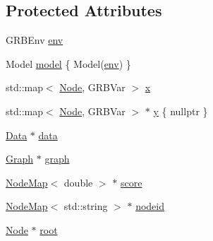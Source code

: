 \subsection*{Protected Attributes}
\begin{DoxyCompactItemize}
\item 
G\+R\+B\+Env \hyperlink{classderegnet_1_1DeregnetModel_accd03120356b80b083041b4eef003e5b}{env}
\item 
Model \hyperlink{classderegnet_1_1DeregnetModel_a30d525de2086e342b33fe3e45ede4947}{model} \{ Model(\hyperlink{classderegnet_1_1DeregnetModel_accd03120356b80b083041b4eef003e5b}{env}) \}
\item 
std\+::map$<$ \hyperlink{namespacederegnet_a744bad34f2de9856d36715a445f027f3}{Node}, G\+R\+B\+Var $>$ \hyperlink{classderegnet_1_1DeregnetModel_a360c980f3fec4dfbab50e9bb06a933a8}{x}
\item 
std\+::map$<$ \hyperlink{namespacederegnet_a744bad34f2de9856d36715a445f027f3}{Node}, G\+R\+B\+Var $>$ $\ast$ \hyperlink{classderegnet_1_1DeregnetModel_ae76df61afe302b939165facf3dd21ac8}{y} \{ nullptr \}
\item 
\hyperlink{avgdrgnt_8cpp_a1d1235306db276e9b36acba1db1509e8}{Data} $\ast$ \hyperlink{classderegnet_1_1DeregnetModel_ad5399761cf6293a702f3800bda4806d1}{data}
\item 
\hyperlink{namespacederegnet_a55b76c55bbabc682cbc61f8b9948799e}{Graph} $\ast$ \hyperlink{classderegnet_1_1DeregnetModel_a3cd2f54b8e061ef5bed32708d9bc1ef1}{graph}
\item 
\hyperlink{namespacederegnet_ae102b707ae1d6f83c639ece5e0dd5658}{Node\+Map}$<$ double $>$ $\ast$ \hyperlink{classderegnet_1_1DeregnetModel_a46224b0bda5bab796d3b7cb41c184a4d}{score}
\item 
\hyperlink{namespacederegnet_ae102b707ae1d6f83c639ece5e0dd5658}{Node\+Map}$<$ std\+::string $>$ $\ast$ \hyperlink{classderegnet_1_1DeregnetModel_adfebf6f9983c9ccc934469a79381fb78}{nodeid}
\item 
\hyperlink{namespacederegnet_a744bad34f2de9856d36715a445f027f3}{Node} $\ast$ \hyperlink{classderegnet_1_1DeregnetModel_a54b20393a0e26d65935d387685d7fe96}{root}
\end{DoxyCompactItemize}
